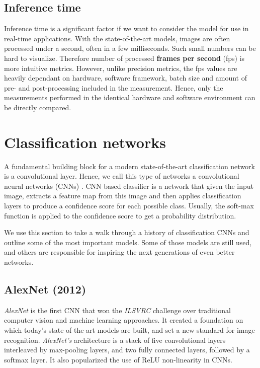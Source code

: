 \subsection*{Inference time}
Inference time is a significant factor if we want to consider the model for use in real-time applications. With the state-of-the-art models, images are often processed under a second, often in a few milliseconds. Such small numbers can be hard to visualize. Therefore number of processed \textbf{frames per second} (fps) is more intuitive metrics. However, unlike precision metrics, the fps values are heavily dependant on hardware, software framework, batch size and amount of pre- and post-processing included in the measurement. Hence, only the measurements performed in the identical hardware and software environment can be directly compared.

\section{Classification networks}
\label{sec:clsnets}
A fundamental building block for a modern state-of-the-art classification network is a convolutional layer. Hence, we call this type of networks a convolutional neural networks (CNNs) \cite[ch.~9]{bib:dlbook}. CNN based classifier is a network that given the input image, extracts a feature map from this image and then applies classification layers to produce a confidence score for each possible class. Usually, the soft-max function is applied to the confidence score to get a probability distribution.

We use this section to take a walk through a history of classification CNNs and outline some of the most important models. Some of those models are still used, and others are responsible for inspiring the next generations of even better networks.

\subsection{AlexNet (2012)}
\textit{AlexNet} \cite{bib:alexnet} is the first CNN that won the \textit{ILSVRC} challenge over traditional computer vision and machine learning approaches. It created a foundation on which today's state-of-the-art models are built, and set a new standard for image recognition. \textit{AlexNet's} architecture is a stack of five convolutional layers interleaved by max-pooling layers, and two fully connected layers, followed by a softmax layer. It also popularized the use of ReLU non-linearity in CNNs.

